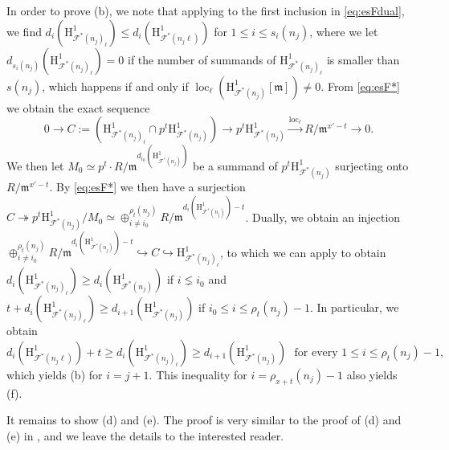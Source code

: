 \documentclass[10pt,reqno]{amsart}
\numberwithin{equation}{section}
\theoremstyle{plain}
\theoremstyle{definition}
\theoremstyle{definition}
\theoremstyle{plain}
\theoremstyle{plain}
\theoremstyle{plain}
\theoremstyle{plain}
\theoremstyle{plain}
\theoremstyle{plain}
\DeclareMathOperator{\loc}{loc}
\newcommand{\Fcal}{\mathcal{F}}
\newcommand{\fm}{\mathfrak{m}}
\newcommand{\rH}{\mathrm{H}}
\begin{document}
In order to prove (b), we note that applying \cite[Lem. 3.3.9]{eisenstein} to the first inclusion in \eqref{eq:esFdual}, we find $d_i(\rH^1_{\Fcal^*(n_j)_{\ell}})\leq d_i(\rH^1_{\Fcal^*(n_j\ell)})$ for $1\leq i\leq s_i(n_j)$, where we let $d_{s_i(n_j)}(\rH^1_{\Fcal^*(n_j)_{\ell}})=0$ if the number of summands of $\rH^1_{\Fcal^*(n_j)_{\ell}}$ is smaller than $s(n_j)$, which happens if and only if $\loc_\ell(\rH^1_{\Fcal^*(n_j)}[\fm])\neq 0$.
From \eqref{eq:esF*} we obtain the exact sequence 
\[
0\to C:=(\rH^1_{\Fcal^*(n_j)_{\ell}}\cap p^t\rH^1_{\Fcal^*(n_j)}) \to p^t\rH^1_{\Fcal^*(n_j)} \xrightarrow{\loc_\ell} R/\fm^{x'-t} \to 0.
\]
We then let $M_0\simeq p^t \cdot R/\fm^{d_{i_0}(\rH^1_{\Fcal^*(n_j)})}$ be a summand of $p^t\rH^1_{\Fcal^*(n_j)}$ surjecting onto $R/\fm^{x'-t}$. By \eqref{eq:esF*}
we then have a surjection $C\twoheadrightarrow  p^t\rH^1_{\Fcal^*(n_j)}/M_0\simeq \oplus^{\rho_t(n_j)}_{i\neq i_0}R/\fm^{d_{i}(\rH^1_{\Fcal^*(n_j)})-t}$. 
Dually, we obtain an injection $ \oplus^{\rho_t(n_j)}_{i\neq i_0}R/\fm^{d_{i}(\rH^1_{\Fcal^*(n_j)})-t} \hookrightarrow C\hookrightarrow \rH^1_{\Fcal^*(n_j)_{\ell}}$, to which we can apply \cite[Lem. 3.3.9]{eisenstein} to obtain $d_i(\rH^1_{\Fcal^*(n_j)_{\ell}})\geq d_i(\rH^1_{\Fcal^*(n_j)})$ if $i\lneq i_0$ and $t+d_i(\rH^1_{\Fcal^*(n_j)_{\ell}})\geq d_{i+1}(\rH^1_{\Fcal^*(n_j)})$ if $i_0\leq i\leq \rho_t(n_j)-1$. In particular, we obtain
\[
 d_i(\rH^1_{\Fcal^*(n_j\ell)}) +t \geq d_i(\rH^1_{\Fcal^*(n_j)_{\ell}}) \geq d_{i+1}(\rH^1_{\Fcal^*(n_j)}) \ \ \ \text{for every } 1\leq i\leq \rho_t(n_j)-1,
\]
which yields (b) for $i=j+1$. This inequality for $i=\rho_{x+t}(n_{j})-1$ also yields (f).

It remains to show (d) and (e). The proof is very similar to the proof of (d) and (e) in \cite[$\S$3.3.3]{eisenstein}, and we leave the details to the interested reader. 
\end{document}
